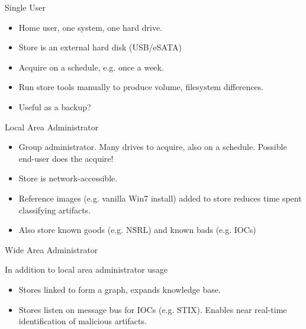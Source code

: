 \documentclass{beamer}
\begin{document}

\begin{frame}{Single User}

\begin{itemize}
\item Home user, one system, one hard drive.

\item Store is an external hard disk (USB/eSATA)

\item Acquire on a schedule, e.g. once a week.

\item Run store tools manually to produce volume, filesystem
  differences.

\item Useful as a backup?

\end{itemize}

\end{frame}


\begin{frame}{Local Area Administrator}

\begin{itemize}
\item Group administrator.  Many drives to acquire, also on a
  schedule.  Possible end-user does the acquire!

\item Store is network-accessible.

\item Reference images (e.g. vanilla Win7 install) added to
  store reduces time spent classifying artifacts.  

\item
Also store known goods (e.g. NSRL) and known bads (e.g. IOCs)

\end{itemize}
\end{frame}


\begin{frame}{Wide Area Administrator}

In addition to local area administrator usage

\begin{itemize}
\item
Stores linked to form a graph, expands knowledge base.

\item
Stores listen on message bus for IOCs (e.g. STIX).  Enables near
real-time identification of malicious artifacts.

\end{itemize}

\end{frame}
\end{document}
